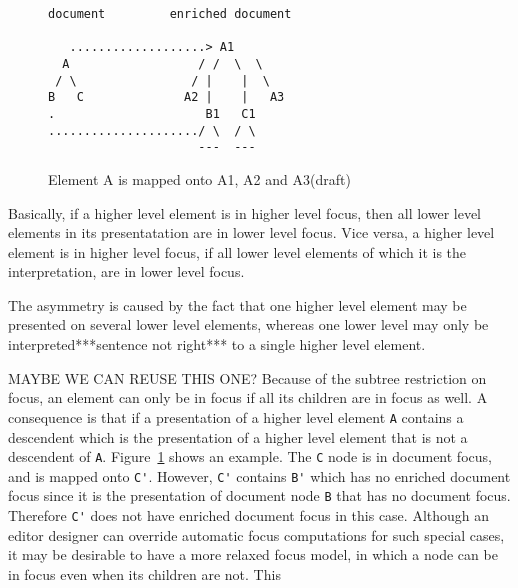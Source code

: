\begin{figure}
\begin{small}
\begin{center}
\begin{verbatim}
document         enriched document

   ...................> A1
  A                  / /  \  \ 
 / \                / |    |  \ 
B   C              A2 |    |   A3
.                     B1   C1  
...................../ \  / \
                     ---  ---
\end{verbatim}
\caption{Element A is mapped onto A1, A2 and A3(draft)}\label{unpresentableFocus} 
\end{center}
\end{small}
\end{figure}

Basically, if a higher level element is in higher level focus, then all lower level elements in its presentatation are in lower level focus. Vice versa, a higher level element is in higher level focus, if all lower level elements of which it is the interpretation, are in lower level focus. 

\bc
The asymmetry is caused by the fact that one higher level element may be presented on several lower level elements, whereas one lower level may only be interpreted***sentence not right*** to a single higher level element.
\ec

\bc MAYBE WE CAN REUSE THIS ONE?
Because of the subtree restriction on focus, an element can only be in focus if all its children are in focus as well.  A consequence is that if a presentation of a higher level element \verb|A| contains a descendent which is the presentation of a higher level element that is not a descendent of \verb|A|. Figure~\ref{unpresentableFocus} shows an example. The \verb|C| node is in document focus, and is mapped onto \verb|C'|. However, \verb|C'| contains \verb|B'| which has no enriched document focus since it is the presentation of document node \verb|B| that has no document focus. Therefore \verb|C'| does not have enriched document focus in this case. Although an editor designer can override automatic focus computations for such special cases, it may be desirable to have a more relaxed focus model, in which a node can be in focus even when its children are not. This 


